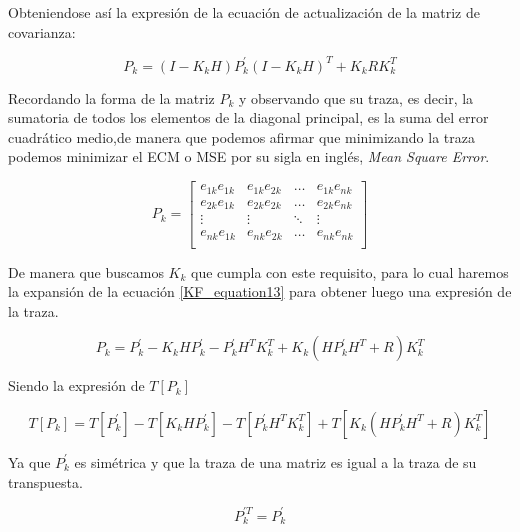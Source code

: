 \documentclass[10pt,a4paper]{article}
\begin{document}
	\noindent Obteniendose así la expresión de la ecuación de actualización de 
    la matriz de covarianza:
	
	\begin{equation}
		P_k = (I-K_k H)P^\prime_k(I-K_k H)^T + K_k R K_k^T 
		\label{KF_equation13}
	\end{equation}	
	
	Recordando la forma de la matriz $P_k$ y observando que su traza, es decir, la sumatoria de todos los elementos de la diagonal principal, es la suma del error cuadrático medio,de manera que podemos afirmar que minimizando la traza podemos minimizar el ECM o MSE por su sigla en inglés, \emph{Mean Square Error}.

	\begin{equation}
		P_k = 
		\begin{bmatrix}
			e_{1k}e_{1k} & e_{1k}e_{2k} &	\dots  & e_{1k}e_{nk} \\
			e_{2k}e_{1k} & e_{2k}e_{2k} &	\dots  & e_{2k}e_{nk} \\
			\vdots       &   \vdots     &	\ddots & \vdots       \\
			e_{nk}e_{1k} & e_{nk}e_{2k} &	\dots  & e_{nk}e_{nk} \\
		\end{bmatrix}
	\end{equation}
	
	De manera que buscamos $K_k$ que cumpla con este requisito, para lo cual haremos la expansión de la ecuación \ref{KF_equation13}  para obtener luego una expresión de la traza.
	
	\begin{equation}
		P_k = P^\prime_k - K_k H P^\prime_k - P^\prime_k H^T K^T_k + K_k (H P^\prime_k H^T + R) K^T_k
		\label{KF_equation14}
	\end{equation}	
	
	Siendo la expresión de $T[P_k]$

	\begin{equation}
		T[P_k] = T[P^\prime_k] - T[K_k H P^\prime_k] - T[P^\prime_k H^T K^T_k] + T[K_k (H P^\prime_k H^T + R) K^T_k]
		\label{KF_equation15}
	\end{equation}	
	
	Ya que $P^\prime_k$ es simétrica  y que la traza de una matriz es igual a la traza de su transpuesta.

	\begin{equation}
		P^{\prime T}_k  = P^\prime_k
		\label{KF_equation16}
	\end{equation}	
	
\end{document}
